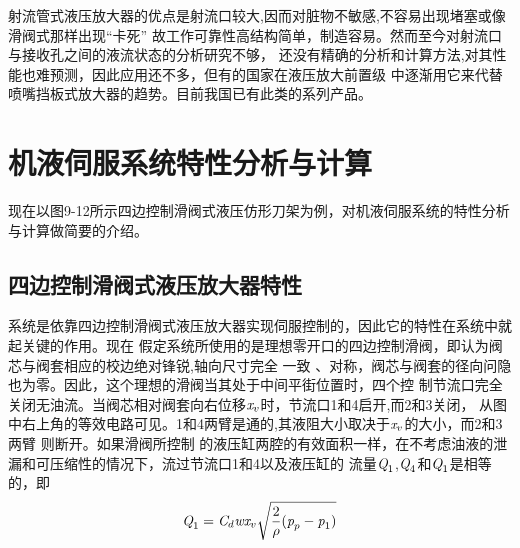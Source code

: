  射流管式液压放大器的优点是射流口较大,因而对脏物不敏感,不容易出现堵塞或像滑阀式那样出现“卡死”
 故工作可靠性高结构简单，制造容易。然而至今对射流口与接收孔之间的液流状态的分析研究不够，
 还没有精确的分析和计算方法,对其性能也难预测，因此应用还不多，但有的国家在液压放大前置级
 中逐渐用它来代替喷嘴挡板式放大器的趋势。目前我国已有此类的系列产品。
 \section{机液伺服系统特性分析与计算}
 现在以图9-12所示四边控制滑阀式液压仿形刀架为例，对机液伺服系统的特性分析与计算做简要的介绍。
 \subsection{四边控制滑阀式液压放大器特性}
 系统是依靠四边控制滑阀式液压放大器实现伺服控制的，因此它的特性在系统中就起关键的作用。现在
 假定系统所使用的是理想零开口的四边控制滑阀，即认为阀芯与阀套相应的校边绝对锋锐,轴向尺寸完全
 一致 、对称，阀芯与阀套的径向问隐也为零。因此，这个理想的滑阀当其处于中间平街位置时，四个控
 制节流口完全关闭无油流。当阀芯相对阀套向右位移$\emph{x}_v$时，节流口1和4启开,而2和3关闭，
 从图中右上角的等效电路可见。1和4两臂是通的,其液阻大小取决于$\emph{x}_v$的大小，而2和3两臂
 则断开。如果滑阀所控制
 的液压缸两腔的有效面积一样，在不考虑油液的泄漏和可压缩性的情况下，流过节流口1和4以及液压缸的
 流量$\emph{Q}_1$,$\emph{Q}_4$和$\emph{Q}_1$是相等的，即
 \begin{equation}
    \emph{Q}_1=\emph{C}_d\emph{w}\emph{x}_v\sqrt{\frac{2}{\rho}(\emph{p}_p-\emph{p}_1)}
 \end{equation}
